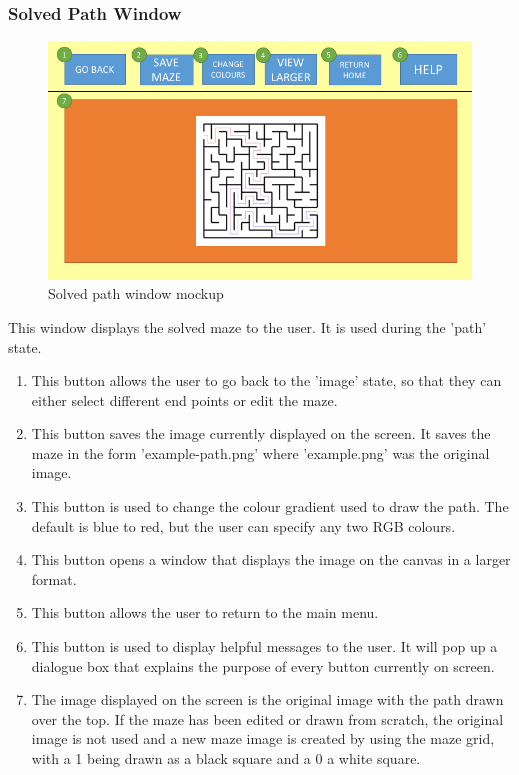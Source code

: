 \documentclass[titlepage]{article}
\begin{document}
\subsubsection{Solved Path Window}
\begin{figure}[H]
  \centering
  \includegraphics[width=12cm]{Slide5.png}
  \caption{Solved path window mockup}
  \label{fig:dijk}
\end{figure}
This window displays the solved maze to the user. It is used during the 'path' state.
\begin{enumerate}
\item This button allows the user to go back to the 'image' state, so that they can either select different end points or edit the maze.
\item This button saves the image currently displayed on the screen. It saves the maze in the form 'example-path.png' where 'example.png' was the original image.
\item This button is used to change the colour gradient used to draw the path. The default is blue to red, but the user can specify any two RGB colours. 
\item This button opens a window that displays the image on the canvas in a larger format. 
\item This button allows the user to return to the main menu.
\item This button is used to display helpful messages to the user. It will pop up a dialogue box that explains the purpose of every button currently on screen.
\item The image displayed on the screen is the original image with the path drawn over the top. If the maze has been edited or drawn from scratch, the original image is not used and a new maze image is created by using the maze grid, with a 1 being drawn as a black square and a 0 a white square.
\end{enumerate}
\end{document}
